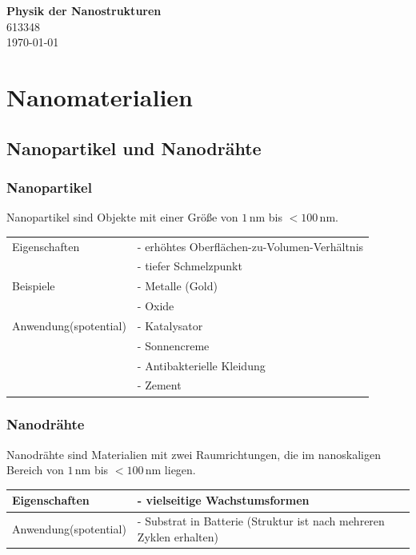 \documentclass{article}
\begin{document}
\begin{center}
	\Large{\textbf{Physik der Nanostrukturen}}\\
	\small{613348}\\
	\small{\today}
\end{center}

\tableofcontents


\newpage


\section{Nanomaterialien}
\subsection{Nanopartikel und Nanodrähte}
\subsubsection{Nanopartikel}
Nanopartikel sind Objekte mit einer Größe von $1\,\text{nm}$ bis $<100\,\text{nm}$.

\begin{table}[H]
	\centering
	\begin{tabularx}{0.75\textwidth}{|l|X|}
		\hline\hline
			Eigenschaften & - erhöhtes Oberflächen-zu-Volumen-Verhältnis\\
			& - tiefer Schmelzpunkt\\
		\hline
			Beispiele & - Metalle (Gold)\\
			& - Oxide\\
		\hline
			Anwendung(spotential) & - Katalysator\\
			& - Sonnencreme \\
			& - Antibakterielle Kleidung \\
			& - Zement \\
		\hline\hline
	\end{tabularx}
\end{table}


\subsubsection{Nanodrähte}
Nanodrähte sind Materialien mit zwei Raumrichtungen, die im nanoskaligen Bereich von $1\,\text{nm}$ bis $<100\,\text{nm}$ liegen. 

\begin{table}[H]
	\centering
	\begin{tabularx}{0.75\textwidth}{|l|X|}
		\hline\hline
			Eigenschaften & - vielseitige Wachstumsformen \\
		\hline
			Anwendung(spotential) & - Substrat in Batterie \textcolor{gruen}{(Struktur ist nach mehreren Zyklen erhalten)}\\
		\hline\hline
	\end{tabularx}
\end{table}
\end{document}

